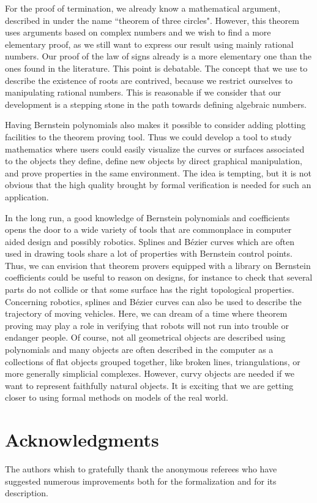 \documentclass{mscs}
\begin{document}
For the proof of termination, we already know a mathematical argument,
described in \cite{bpr} under the name ``theorem of three
circles". However, this theorem uses arguments based on complex
numbers and we wish to find a more elementary proof, as we still want
to express our result using mainly rational numbers.  Our proof of the
law of signs already is a more elementary one than the ones found in
the literature. This point is debatable. The concept that we use to
describe the existence of roots are contrived, because we restrict
ourselves to manipulating rational numbers. This is reasonable if we
consider that our development is a stepping stone in the path towards
defining algebraic numbers.

Having Bernstein polynomials also makes it possible to consider adding
plotting facilities to the theorem proving tool. Thus we could develop
a tool to study mathematics where users could easily visualize the
curves or surfaces associated to the objects they define, define new
objects by direct graphical manipulation, and prove properties in the
same environment. The idea is tempting, but it is not obvious that the
high quality brought by formal verification is needed for such an
application.

In the long run, a good knowledge of Bernstein polynomials and
coefficients opens the door to a wide variety of tools that are
commonplace in computer aided design and possibly robotics. Splines
and B\'ezier curves which are often used in drawing tools share a lot of
properties with Bernstein control points. Thus, we can envision that
theorem provers equipped with a library on Bernstein coefficients
could be useful to reason on designs, for instance to check that
several parts do not collide or that some surface has the right
topological properties. Concerning robotics, splines and B\'ezier curves
can also be used to describe the trajectory of moving vehicles. Here,
we can dream of a time where theorem proving may play a role in
verifying that robots will not run into trouble or endanger people. Of
course, not all geometrical objects are described using polynomials
and many objects are often described in the computer as a collections
of flat objects grouped together, like broken lines, triangulations,
or more generally simplicial complexes. However, curvy objects are
needed if we want to represent faithfully natural objects. It is
exciting that we are getting closer to using formal methods on models
of the real world.

\section{Acknowledgments} The authors whish to gratefully thank the
anonymous referees who have suggested numerous improvements both for
the formalization and for its description.



\end{document}
